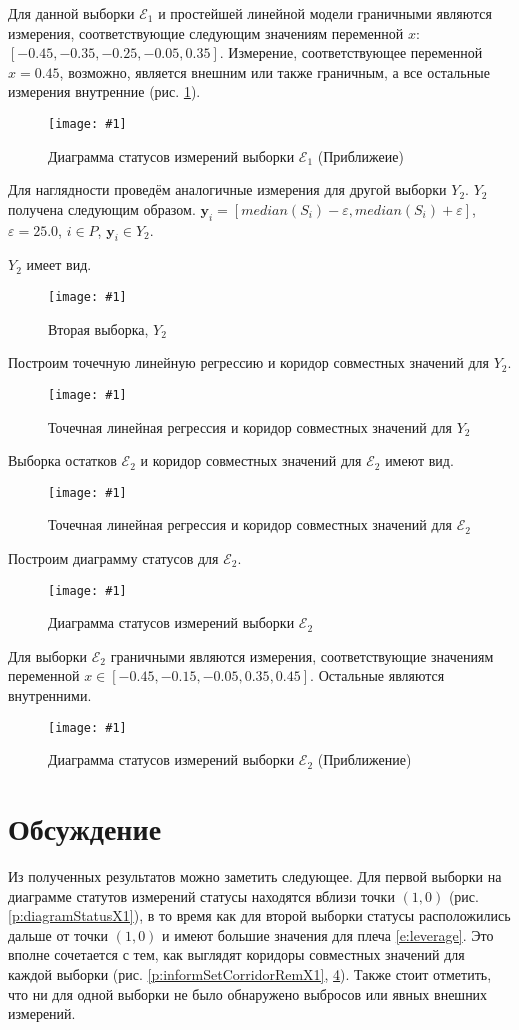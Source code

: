 \documentclass[a4paper,12pt]{article}
\newcommand{\plot}[3]{
    \begin{figure}[H]
        \begin{center}
            \texttt{[image: \#1]}
            \caption{#2}
            \label{#3}
        \end{center}
    \end{figure}
}
\begin{document}
    Для данной выборки $ \mathcal{E}_1 $ и простейшей линейной модели граничными являются
    измерения, соответствующие следующим значениям переменной $ x $: $ [-0.45, -0.35, -0.25, -0.05, 0.35] $.
    Измерение, соответствующее переменной $ x = 0.45 $, возможно, является внешним или также граничным,
    а все остальные измерения внутренние (рис. \ref{p:diagramStatusZoomX1}).
    \plot{DiagramStatusZoomX1}{Диаграмма статусов измерений выборки $ \mathcal{E}_1 $ (Приближеие)}{p:diagramStatusZoomX1}

    Для наглядности проведём аналогичные измерения для другой выборки $ Y_2 $.
    $ Y_2 $ получена следующим образом. $ \textbf{y}_i = [median(S_i) - \varepsilon, median(S_i) + \varepsilon] $,
    $ \varepsilon = 25.0 $, $ i \in P $, $ \textbf{y}_i \in Y_2 $. 

    $ Y_2 $ имеет вид.
    \plot{SampleX2}{Вторая выборка, $ Y_2 $}{p:sampleX2}

    Построим точечную линейную регрессию и коридор совместных значений для $ Y_2 $.
    \plot{InformSetCorridorX2}{Точечная линейная регрессия и коридор совместных значений для $ Y_2 $}{p:informSetCorridorX2}

    Выборка остатков $ \mathcal{E}_2 $ и коридор совместных значений для $ \mathcal{E}_2 $ имеют вид.
    \plot{InformSetCorridorRemX2}{Точечная линейная регрессия и коридор совместных значений для $ \mathcal{E}_2 $}{p:informSetCorridorRemX2}

    Построим диаграмму статусов для $ \mathcal{E}_2 $.
    \plot{DiagramStatusX2}{Диаграмма статусов измерений выборки $ \mathcal{E}_2 $}{p:diagramStatusX2}

    Для выборки $ \mathcal{E}_2 $ граничными являются измерения, соответствующие значениям
    переменной $ x \in [-0.45, -0.15, -0.05, 0.35, 0.45] $.
    Остальные являются внутренними.
    \plot{DiagramStatusZoomX2}{Диаграмма статусов измерений выборки $ \mathcal{E}_2 $ (Приближение)}{p:diagramStatusZoomX2}

    \section{Обсуждение}
    \quad Из полученных результатов можно заметить следующее.
    Для первой выборки на диаграмме статутов измерений статусы находятся вблизи точки $ (1, 0) $ (рис. \ref{p:diagramStatusX1}),
    в то время как для второй выборки статусы расположились дальше от точки $ (1, 0) $
    и имеют большие значения для плеча \ref{e:leverage}.
    Это вполне сочетается с тем, как выглядят коридоры совместных значений для каждой выборки
    (рис. \ref{p:informSetCorridorRemX1}, \ref{p:informSetCorridorRemX2}).
    Также стоит отметить, что ни для одной выборки не было обнаружено выбросов или явных внешних измерений.
\end{document}
